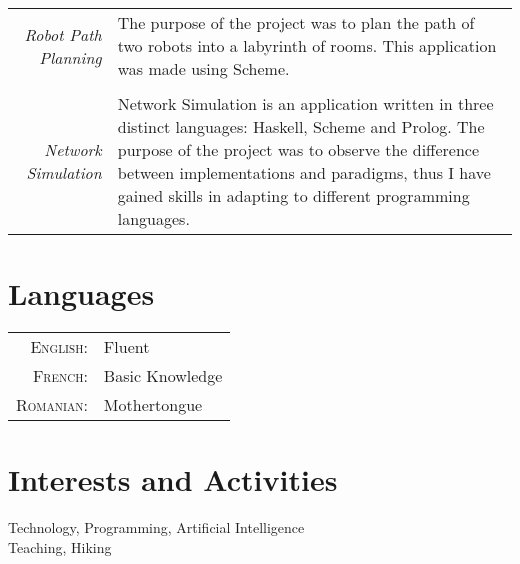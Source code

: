 \documentclass[a4paper,10pt]{article} %
\begin{document}
\begin{tabular}{r|p{11cm}}
\emph{Robot Path Planning}
& \footnotesize{The purpose of the project was to plan the path of two robots into a labyrinth of rooms. This application was made using Scheme.}\\
\multicolumn{2}{c}{} \\


\emph{Network Simulation}
& \footnotesize{Network Simulation is an application written in three distinct languages: Haskell, Scheme and Prolog. The purpose of the project was to observe the difference between implementations and paradigms, thus I have gained skills in adapting to different programming languages.}
\end{tabular}


\section{Languages}

\begin{tabular}{rl}
\textsc{English:} & Fluent\\
\textsc{French:} & Basic Knowledge\\
\textsc{Romanian:} & Mothertongue\\
\end{tabular}


\section{Interests and Activities}

Technology, Programming, Artificial Intelligence \\
Teaching, Hiking

\end{document}
